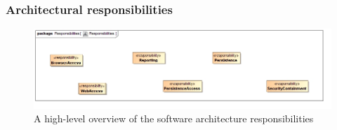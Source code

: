 \subsubsection{Architectural responsibilities}
\begin{figure}[H]
	\begin{center}
	\includegraphics[scale=0.4]{../Diagrams and Charts/Architecture/Responsibilities.jpg}
	\caption{A high-level overview of the software architecture responsibilities}
	\end{center}
	\label{ref:architectureResponsibilities}
\end{figure}